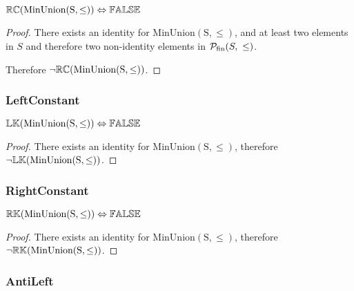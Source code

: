 \documentclass[../Summary.tex]{subfiles}
\begin{document}
\begin{theorem} \label{thm:minunion_rc}
${\mathbb{RC}}(\mathrm{MinUnion(S,\leq)}) \Leftrightarrow {\mathbb{FALSE}}$
\end{theorem}

\begin{proof}
There exists an identity for $\mathrm{MinUnion(S,\leq)}$, and at least two elements in $S$ and therefore two non-identity elements in ${\cal P}_{\mathrm{fin}}(S,\ \leq)$. 

\vspace{0.5em}

Therefore $\neg {\mathbb{RC}}(\mathrm{MinUnion(S,\leq)})$.
\end{proof}





\subsubsection{LeftConstant}
\begin{theorem} \label{thm:minunion_lk}
${\mathbb{LK}}(\mathrm{MinUnion(S,\leq)}) \Leftrightarrow {\mathbb{FALSE}}$
\end{theorem}

\begin{proof}
There exists an identity for $\mathrm{MinUnion(S,\leq)}$, therefore $\neg {\mathbb{LK}}(\mathrm{MinUnion(S,\leq)})$.
\end{proof}





\subsubsection{RightConstant}

\begin{theorem} \label{thm:minunion_rk}
${\mathbb{RK}}(\mathrm{MinUnion(S,\leq)}) \Leftrightarrow {\mathbb{FALSE}}$
\end{theorem}

\begin{proof}
There exists an identity for $\mathrm{MinUnion(S,\leq)}$, therefore $\neg {\mathbb{RK}}(\mathrm{MinUnion(S,\leq)})$.
\end{proof}





\subsubsection{AntiLeft}
\end{document}
